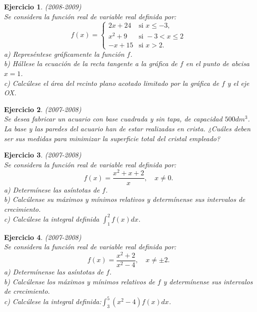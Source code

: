 \documentclass[12pt, a4paper]{amsart}
\newtheorem{ejer}{Ejercicio}
\begin{document}
\begin{ejer}\em (2008-2009)\\%
Se considera la función real de variable real definida por:
\begin{equation*}
f(x)=\left \{ \begin{matrix} 2x+24 & \mbox{si } x\leq -3,
\\ x^2+9 & \mbox{si } -3<x\leq 2
\\ -x+15 & \mbox{si } x>2. \end{matrix}\right. 
\end{equation*}
a) Represéntese gráficamente la función $f$.\\
b) Hállese la ecuación de la recta tangente a la gráfica de $f$ en el punto de abcisa $x=1$.\\
c) Calcúlese el área del recinto plano acotado limitado por la gráfica de $f$ y el eje OX.
\end{ejer}

\begin{ejer}\em  (2007-2008)\\
Se desea fabricar un acuario con base cuadrada y sin tapa, de capacidad $500 dm^3$. La base y las paredes del acuario han de estar realizadas en crista. ¿Cuáles deben ser sus medidas para minimizar la superficie total del cristal empleado?
\end{ejer}

\begin{ejer}\em (2007-2008)\\%
Se considera la función real de variable real definida por:
$$
f(x)=\frac{x^2+x+2}{x}, \quad x\neq 0.
$$
a) Determínese las asíntotas de $f$.\\
b) Calcúlense su máximos y mínimos relativos y determínense sus intervalos de crecimiento.\\
c) Calcúlese la integral definida $\int_1^2 f(x)dx$.
\end{ejer}

\begin{ejer}\em (2007-2008)\\%
Se considera la función real de variable real definida por:
$$
f(x)=\frac{x^2+2}{x^2-4}, \quad x\neq \pm 2.
$$
a) Determínense las asíntotas de $f$.\\
b) Calcúlense los máximos y mínimos relativos de $f$ y determínense sus intervalos de crecimiento.\\
c) Calcúlese la integral definida:$\int_3^5(x^2-4)f(x)dx$.
\end{ejer}
\end{document}
